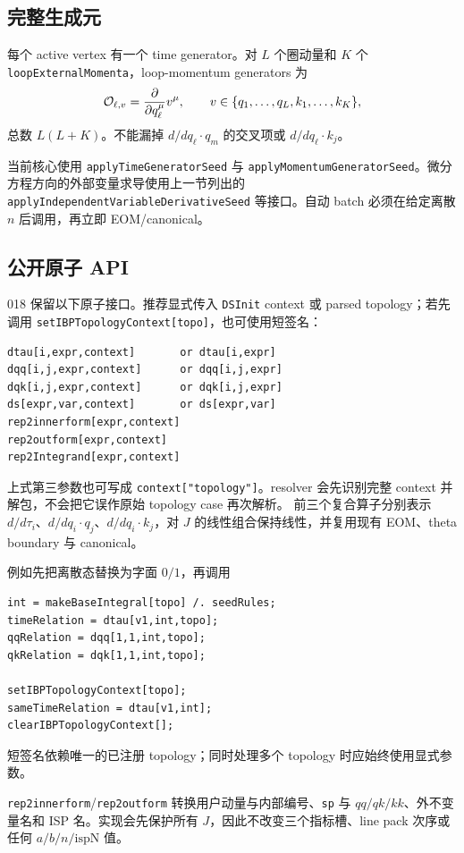 ﻿\documentclass[a4paper,11pt]{article}
\begin{document}
\subsection{完整生成元}

每个 active vertex 有一个 time generator。对 $L$ 个圈动量和 $K$ 个 \texttt{loopExternal\allowbreak Momenta}，loop-momentum generators 为
\begin{equation}
 {\cal O}_{\ell,v}
 =\frac{\partial}{\partial q_\ell^\mu}v^\mu,
 \qquad
 v\in\{q_1,\ldots,q_L,k_1,\ldots,k_K\},
\end{equation}
总数 $L(L+K)$。不能漏掉 $d/dq_\ell\cdot q_m$ 的交叉项或 $d/dq_\ell\cdot k_j$。

当前核心使用 \texttt{applyTimeGeneratorSeed} 与 \texttt{applyMomentumGeneratorSeed}。微分方程方向的外部变量求导使用上一节列出的 \texttt{applyIndependentVariableDerivativeSeed} 等接口。自动 batch 必须在给定离散 $n$ 后调用，再立即 EOM/canonical。

\subsection{公开原子 API}

018 保留以下原子接口。推荐显式传入 \texttt{DSInit} context 或 parsed topology；若先调用 \texttt{setIBPTopologyContext[topo]}，也可使用短签名：
\begin{verbatim}
dtau[i,expr,context]       or dtau[i,expr]
dqq[i,j,expr,context]      or dqq[i,j,expr]
dqk[i,j,expr,context]      or dqk[i,j,expr]
ds[expr,var,context]       or ds[expr,var]
rep2innerform[expr,context]
rep2outform[expr,context]
rep2Integrand[expr,context]
\end{verbatim}
上式第三参数也可写成 \texttt{context["topology"]}。resolver 会先识别完整 context 并解包，不会把它误作原始 topology case 再次解析。
前三个复合算子分别表示 $d/d\tau_i$、$d/dq_i\cdot q_j$、$d/dq_i\cdot k_j$，对 $J$ 的线性组合保持线性，并复用现有 EOM、theta boundary 与 canonical。

例如先把离散态替换为字面 $0/1$，再调用
\begin{verbatim}
int = makeBaseIntegral[topo] /. seedRules;
timeRelation = dtau[v1,int,topo];
qqRelation = dqq[1,1,int,topo];
qkRelation = dqk[1,1,int,topo];

setIBPTopologyContext[topo];
sameTimeRelation = dtau[v1,int];
clearIBPTopologyContext[];
\end{verbatim}
短签名依赖唯一的已注册 topology；同时处理多个 topology 时应始终使用显式参数。

\texttt{rep2innerform}/\texttt{rep2outform} 转换用户动量与内部编号、\texttt{sp} 与 $qq/qk/kk$、外不变量名和 ISP 名。实现会先保护所有 $J$，因此不改变三个指标槽、line pack 次序或任何 $a/b/n/\mathrm{ispN}$ 值。
\end{document}
